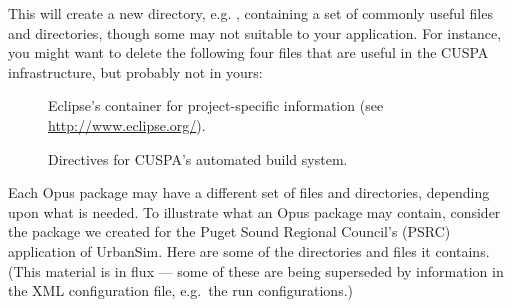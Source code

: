 This will create a new directory, e.g. ,
containing a set of commonly useful files and directories, though some may not
suitable to your application. For instance, you might want to delete the
following four files that are useful in the CUSPA \cuspaindex infrastructure,
but probably not in yours:

\begin{description}

\item[]  Eclipse's \eclipseindex
container for project-specific information (see \url{http://www.eclipse.org/}).

\item[]
Directives for CUSPA's \cuspaindex automated build system.

\end{description}

Each Opus package may have a different set of files and directories, depending
upon what is needed. To illustrate what an Opus package may contain, consider
the  package we created for the Puget Sound Regional
Council's (PSRC) \psrcindex application
of UrbanSim.  Here are some of the directories and files it contains.  (This
material is in flux --- some
of these are being superseded by information in the XML configuration file, e.g.\
the run configurations.)


